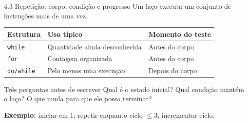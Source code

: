 \begin{frame}{4.3 Repetição: corpo, condição e progresso}
\small
Um laço executa um conjunto de instruções mais de uma vez.
\begin{tabularx}{\textwidth}{lXX}
\toprule
Estrutura & Uso típico & Momento do teste \\
\midrule
\texttt{while} & Quantidade ainda desconhecida & Antes do corpo \\
\texttt{for} & Contagem organizada & Antes do corpo \\
\texttt{do/while} & Pelo menos uma execução & Depois do corpo \\
\bottomrule
\end{tabularx}
\vspace{0.35cm}
\begin{block}{Três perguntas antes de escrever}
Qual é o estado inicial? Qual condição mantém o laço? O que muda para que ele possa terminar?
\end{block}
\textbf{Exemplo:} iniciar em 1; repetir enquanto ciclo $\leq 3$; incrementar ciclo.
\end{frame}

